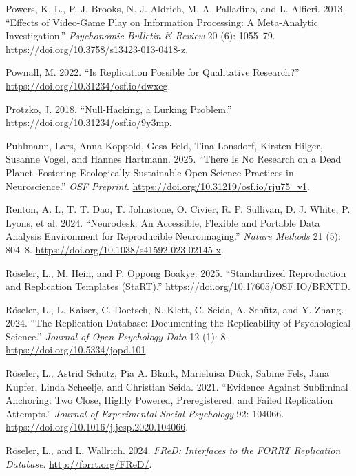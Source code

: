 \documentclass[
  letterpaper,
  DIV=11,
  openany,
  fontsize=12pt,
  parskip=half,
  headings=big,
  numbers=noenddot,
  titlepage=false]{scrreprt}
\newlength{\cslhangindent}
\newenvironment{CSLReferences}[2] %
 {\begin{list}{}{%
  \setlength{\itemindent}{0pt}
  \setlength{\leftmargin}{0pt}
  \setlength{\parsep}{0pt}
  \ifodd #1
   \setlength{\leftmargin}{\cslhangindent}
   \setlength{\itemindent}{-1\cslhangindent}
  \fi
  \setlength{\itemsep}{#2\baselineskip}}}
 {\end{list}}
\begin{document}
\begin{CSLReferences}{1}{0}
Powers, K. L., P. J. Brooks, N. J. Aldrich, M. A. Palladino, and L.
Alfieri. 2013. {``Effects of Video-Game Play on Information Processing:
A Meta-Analytic Investigation.''} \emph{Psychonomic Bulletin \& Review}
20 (6): 1055--79. \url{https://doi.org/10.3758/s13423-013-0418-z}.

Pownall, M. 2022. {``Is Replication Possible for Qualitative
Research?''} \url{https://doi.org/10.31234/osf.io/dwxeg}.

Protzko, J. 2018. {``Null-Hacking, a Lurking Problem.''}
\url{https://doi.org/10.31234/osf.io/9y3mp}.

Puhlmann, Lars, Anna Koppold, Gesa Feld, Tina Lonsdorf, Kirsten Hilger,
Susanne Vogel, and Hannes Hartmann. 2025. {``There Is No Research on a
Dead Planet--Fostering Ecologically Sustainable Open Science Practices
in Neuroscience.''} \emph{OSF Preprint}.
\url{https://doi.org/10.31219/osf.io/rju75_v1}.

Renton, A. I., T. T. Dao, T. Johnstone, O. Civier, R. P. Sullivan, D. J.
White, P. Lyons, et al. 2024. {``Neurodesk: An Accessible, Flexible and
Portable Data Analysis Environment for Reproducible Neuroimaging.''}
\emph{Nature Methods} 21 (5): 804--8.
\url{https://doi.org/10.1038/s41592-023-02145-x}.

Röseler, L., M. Hein, and P. Oppong Boakye. 2025. {``Standardized
Reproduction and Replication Templates (StaRT).''}
\url{https://doi.org/10.17605/OSF.IO/BRXTD}.

Röseler, L., L. Kaiser, C. Doetsch, N. Klett, C. Seida, A. Schütz, and
Y. Zhang. 2024. {``The Replication Database: Documenting the
Replicability of Psychological Science.''} \emph{Journal of Open
Psychology Data} 12 (1): 8. \url{https://doi.org/10.5334/jopd.101}.

Röseler, L., Astrid Schütz, Pia A. Blank, Marieluisa Dück, Sabine Fels,
Jana Kupfer, Linda Scheelje, and Christian Seida. 2021. {``Evidence
Against Subliminal Anchoring: Two Close, Highly Powered, Preregistered,
and Failed Replication Attempts.''} \emph{Journal of Experimental Social
Psychology} 92: 104066.
\url{https://doi.org/10.1016/j.jesp.2020.104066}.

Röseler, L., and L. Wallrich. 2024. \emph{FReD: Interfaces to the FORRT
Replication Database}. \url{http://forrt.org/FReD/}.


\end{CSLReferences}
\end{document}
